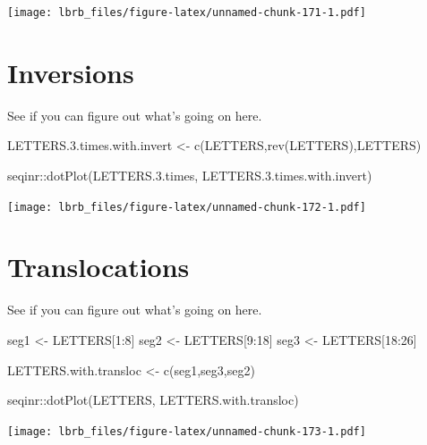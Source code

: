\documentclass[
]{book}
\newenvironment{Shaded}{\begin{snugshade}}{\end{snugshade}}
\newcommand{\DecValTok}[1]{\textcolor[rgb]{0.00,0.00,0.81}{#1}}
\newcommand{\FloatTok}[1]{\textcolor[rgb]{0.00,0.00,0.81}{#1}}
\newcommand{\FunctionTok}[1]{\textcolor[rgb]{0.00,0.00,0.00}{#1}}
\newcommand{\NormalTok}[1]{#1}
\newcommand{\OtherTok}[1]{\textcolor[rgb]{0.56,0.35,0.01}{#1}}
\newcommand{\SpecialCharTok}[1]{\textcolor[rgb]{0.00,0.00,0.00}{#1}}
\begin{document}
\texttt{[image: lbrb\_files/figure-latex/unnamed-chunk-171-1.pdf]}

\hypertarget{inversions}{%
\section{Inversions}\label{inversions}}

See if you can figure out what's going on here.

\begin{Shaded}
\begin{Highlighting}[]
\NormalTok{LETTERS.}\FloatTok{3.}\NormalTok{times.with.invert }\OtherTok{\textless{}{-}} \FunctionTok{c}\NormalTok{(LETTERS,}\FunctionTok{rev}\NormalTok{(LETTERS),LETTERS)}

\NormalTok{seqinr}\SpecialCharTok{::}\FunctionTok{dotPlot}\NormalTok{(LETTERS.}\FloatTok{3.}\NormalTok{times, }
\NormalTok{                LETTERS.}\FloatTok{3.}\NormalTok{times.with.invert)}
\end{Highlighting}
\end{Shaded}

\texttt{[image: lbrb\_files/figure-latex/unnamed-chunk-172-1.pdf]}

\hypertarget{translocations}{%
\section{Translocations}\label{translocations}}

See if you can figure out what's going on here.

\begin{Shaded}
\begin{Highlighting}[]
\NormalTok{seg1 }\OtherTok{\textless{}{-}}\NormalTok{ LETTERS[}\DecValTok{1}\SpecialCharTok{:}\DecValTok{8}\NormalTok{]}
\NormalTok{seg2 }\OtherTok{\textless{}{-}}\NormalTok{ LETTERS[}\DecValTok{9}\SpecialCharTok{:}\DecValTok{18}\NormalTok{]}
\NormalTok{seg3 }\OtherTok{\textless{}{-}}\NormalTok{ LETTERS[}\DecValTok{18}\SpecialCharTok{:}\DecValTok{26}\NormalTok{]}

\NormalTok{LETTERS.with.transloc }\OtherTok{\textless{}{-}} \FunctionTok{c}\NormalTok{(seg1,seg3,seg2)}

\NormalTok{seqinr}\SpecialCharTok{::}\FunctionTok{dotPlot}\NormalTok{(LETTERS, }
\NormalTok{                LETTERS.with.transloc)}
\end{Highlighting}
\end{Shaded}

\texttt{[image: lbrb\_files/figure-latex/unnamed-chunk-173-1.pdf]}
\end{document}
